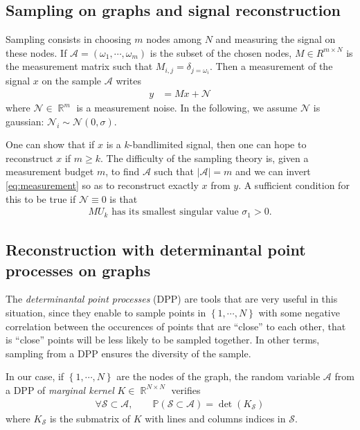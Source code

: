 \documentclass{article}
\newcommand{\abs} [1] {\left| #1 \right|}
\DeclareMathOperator{\R}{\mathbb{R}}
\begin{document}
\subsection{Sampling on graphs and signal reconstruction}


Sampling consists in choosing $m$ nodes among $N$ and measuring the signal on these nodes. If $\mathcal{A} = (\omega_1, \cdots, \omega_m)$ is the subset of the chosen nodes, $M \in R^{m \times N}$ is the measurement matrix such that $M_{i, j} = \delta_{j = \omega_i}$. Then a measurement of the signal $x$ on the sample $\mathcal{A}$ writes
\begin{align} y &= M x + \mathcal{N} \label{eq:measurement}\end{align}
where $\mathcal{N} \in \R^m$ is a measurement noise. In the following, we assume $\mathcal{N}$ is gaussian: $\mathcal{N}_i \sim \mathcal{N}(0, \sigma)$.


One can show that if $x$ is a $k$-bandlimited signal, then one can hope to reconstruct $x$ if $m \geq k$. The difficulty of the sampling theory is, given a measurement budget $m$, to find $\mathcal{A}$ such that $\abs{\mathcal{A}} = m$ and we can invert \eqref{eq:measurement} so as to reconstruct exactly $x$ from $y$. A sufficient condition for this to be true if $\mathcal{N} \equiv 0$ is that 
\begin{align} \text{$MU_k$ has its smallest singular value $\sigma_1 > 0$.} \label{eq:sufficientconditionreconstruction}\end{align}


\subsection{Reconstruction with determinantal point processes on graphs}


The \emph{determinantal point processes} (DPP) \cite{kuelsza2012} are tools that are very useful in this situation, since they enable to sample points in $\left\{ 1, \cdots, N\right\}$ with some negative correlation between the occurences of points that are ``close'' to each other, that is ``close'' points will be less likely to be sampled together. In other terms, sampling from a DPP ensures the diversity of the sample.


In our case, if $\left\{ 1, \cdots, N\right\}$ are the nodes of the graph, the random variable $\mathcal{A}$ from a DPP of \emph{marginal kernel} $K \in \R^{N \times N}$ verifies
\begin{align} \forall \mathcal{S} \subset \mathcal{A}, \qquad \mathbb{P}(\mathcal{S} \subset \mathcal{A}) = \det(K_\mathcal{S}) \label{eq:defDPP}\end{align}
where $K_\mathcal{S}$ is the submatrix of $K$ with lines and columns indices in $\mathcal{S}$.
\end{document}
